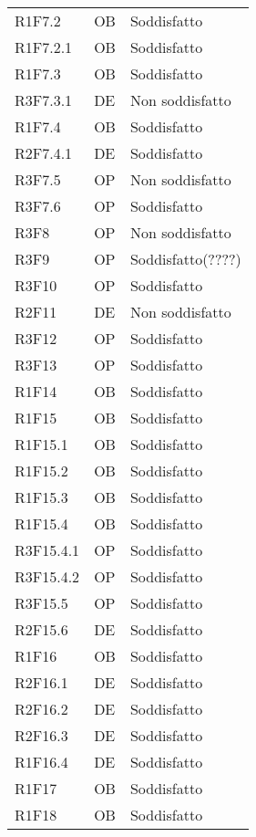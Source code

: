 {\begin{longtable}{C{2.5cm} C{2cm} C{3.5cm}}
R1F7.2 & OB & Soddisfatto\\
R1F7.2.1 & OB & Soddisfatto\\
R1F7.3 & OB & Soddisfatto\\
R3F7.3.1 & DE & Non soddisfatto\\
R1F7.4 &  OB & Soddisfatto\\
R2F7.4.1 & DE & Soddisfatto\\
R3F7.5 & OP & Non soddisfatto\\
R3F7.6 & OP & Soddisfatto\\
R3F8 & OP & Non soddisfatto\\
R3F9 & OP & Soddisfatto(????)\\
R3F10 & OP & Soddisfatto\\
R2F11 & DE & Non soddisfatto\\
R3F12 & OP & Soddisfatto\\
R3F13 & OP & Soddisfatto\\
R1F14 & OB & Soddisfatto\\
R1F15 & OB & Soddisfatto\\
R1F15.1 & OB & Soddisfatto\\
R1F15.2 & OB & Soddisfatto\\
R1F15.3 & OB & Soddisfatto\\
R1F15.4 & OB & Soddisfatto\\
R3F15.4.1 & OP & Soddisfatto\\
R3F15.4.2 & OP & Soddisfatto\\
R3F15.5 & OP & Soddisfatto\\
R2F15.6 & DE & Soddisfatto\\
R1F16 & OB & Soddisfatto\\ 
R2F16.1 & DE & Soddisfatto\\
R2F16.2 & DE & Soddisfatto\\
R2F16.3 & DE & Soddisfatto\\
R1F16.4 & DE & Soddisfatto \\
R1F17 & OB & Soddisfatto\\
R1F18 & OB & Soddisfatto\\

\end{longtable}
}	